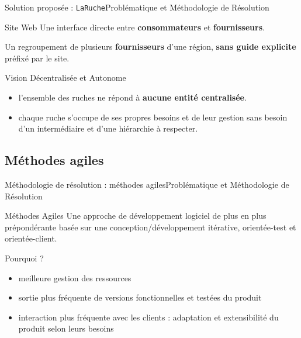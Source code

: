 \documentclass[usenames,dvipsnames]{beamer}
\begin{document}
\begin{frame}{Solution proposée : \texttt{LaRuche}}{Problématique et Méthodologie de Résolution}
\begin{block}{Site Web}
Une interface directe entre \textbf{consommateurs} et \textbf{fournisseurs}.
\end{block}

\begin{definition}[Ruche]
Un regroupement de plusieurs \textbf{fournisseurs} d'une région, \textbf{sans guide explicite} préfixé par le site.
\end{definition}

\begin{block}{Vision Décentralisée et Autonome}
\begin{itemize}
  \item l'ensemble des ruches ne répond à \textbf{aucune entité centralisée}.
  \item chaque ruche s'occupe de ses propres besoins et de leur gestion sans besoin d'un intermédiaire et d'une hiérarchie à respecter.
\end{itemize}
\end{block}
\end{frame}

\subsection{Méthodes agiles}
\begin{frame}{Méthodologie de résolution : méthodes agiles}{Problématique et Méthodologie de Résolution}
\begin{block}{Méthodes Agiles}
Une approche de développement logiciel de plus en plus prépondérante basée sur une conception/développement itérative, orientée-test et orientée-client.
\end{block}

\begin{block}{Pourquoi ?}
\begin{itemize}
  \item meilleure gestion des ressources
  \item sortie plus fréquente de versions fonctionnelles et testées du produit
  \item interaction plus fréquente avec les clients : adaptation et extensibilité du produit selon leurs besoins
\end{itemize}
\end{block}
\end{frame}
\end{document}
